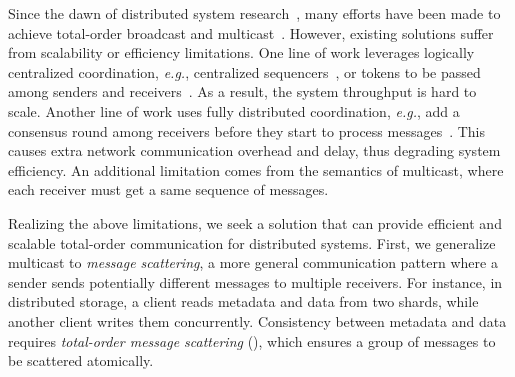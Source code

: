 Since the dawn of distributed system research~\cite{lamport1978time}, many efforts have been made to achieve total-order broadcast and multicast~\cite{defago2004total}.
However, existing solutions suffer from scalability or efficiency limitations. One line of work leverages logically centralized coordination, \textit{e.g.}, centralized sequencers~\cite{eris}, or tokens to be passed among senders and receivers~\cite{rajagopalan1989token,kim1997total,ekwall2004token}. As a result, the system throughput is hard to scale. Another line of work uses fully distributed coordination, \textit{e.g.}, add a consensus round among receivers before they start to process messages~\cite{lamport1978time,chandra1996unreliable}. This causes extra network communication overhead and delay, thus degrading system efficiency.
An additional limitation comes from the semantics of multicast, where each receiver must get a same sequence of messages. 

Realizing the above limitations, we seek a solution that can provide efficient and scalable total-order communication for distributed systems.
First, we generalize multicast to \textit{message scattering}, a more general communication pattern where a sender sends potentially different messages to multiple receivers.
For instance, in distributed storage, a client reads metadata and data from two shards, while another client writes them concurrently. Consistency between metadata and data requires \textit{total-order message scattering} (\sys), which ensures a group of messages to be scattered atomically.

